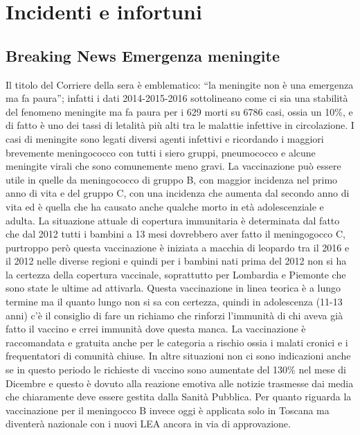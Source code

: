 \section{Incidenti e infortuni}

\subsection{Breaking News Emergenza meningite}

Il titolo del Corriere della sera è emblematico: ``la meningite non è
una emergenza ma fa paura''; infatti i dati 2014-2015-2016 sottolineano
come ci sia una stabilità del fenomeno meningite ma fa paura per i 629
morti su 6786 casi, ossia un 10\%, e di fatto è uno dei tassi di
letalità più alti tra le malattie infettive in circolazione. I casi di
meningite sono legati diversi agenti infettivi e ricordando i maggiori
brevemente meningococco con tutti i siero gruppi, pneumococco e alcune
meningite virali che sono comunemente meno gravi. La vaccinazione può
essere utile in quelle da meningococco di gruppo B, con maggior
incidenza nel primo anno di vita e del gruppo C, con una incidenza che
aumenta dal secondo anno di vita ed è quella che ha causato anche
qualche morto in età adolescenziale e adulta. La situazione attuale di
copertura immunitaria è determinata dal fatto che dal 2012 tutti i
bambini a 13 mesi dovrebbero aver fatto il meningogocco C, purtroppo
però questa vaccinazione è iniziata a macchia di leopardo tra il 2016 e
il 2012 nelle diverse regioni e quindi per i bambini nati prima del 2012
non si ha la certezza della copertura vaccinale, soprattutto per
Lombardia e Piemonte che sono state le ultime ad attivarla. Questa
vaccinazione in linea teorica è a lungo termine ma il quanto lungo non
si sa con certezza, quindi in adolescenza (11-13 anni) c'è il consiglio
di fare un richiamo che rinforzi l'immunità di chi aveva già fatto il
vaccino e crrei immunità dove questa manca. La vaccinazione è
raccomandata e gratuita anche per le categoria a rischio ossia i malati
cronici e i frequentatori di comunità chiuse. In altre situazioni non ci
sono indicazioni anche se in questo periodo le richieste di vaccino sono
aumentate del 130\% nel mese di Dicembre e questo è dovuto alla reazione
emotiva alle notizie trasmesse dai media che chiaramente deve essere
gestita dalla Sanità Pubblica. Per quanto riguarda la vaccinazione per
il meningocco B invece oggi è applicata solo in Toscana ma diventerà
nazionale con i nuovi LEA ancora in via di approvazione.

